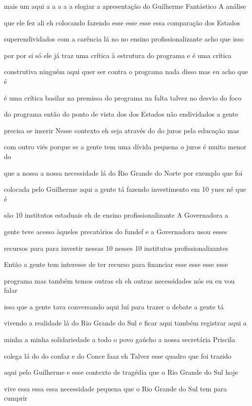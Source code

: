 \documentclass[a4paper,12pt]{article}
\begin{document}
mais um aqui a a a a a elogiar a apresentação do Guilherme Fantástico A análise

que ele fez ali eh colocando fazendo esse esse esse essa comparação dos Estados

superendividados com a carência lá no no ensino profissionalizante acho que isso

por por si só ele já traz uma crítica à estrutura do programa e é uma crítica

construtiva ninguém aqui quer ser contra o programa nada disso mas eu acho que é

é uma crítica basilar na premissa do programa na falta talvez no desvio do foco

do programa então do ponto de vista dos dos Estados não endividados a gente

precisa se inserir Nesse contexto eh seja através do do juros pela educação mas

com outro viés porque se a gente tem uma dívida pequena o juros é muito menor do

que a nossa a nossa necessidade lá do Rio Grande do Norte por exemplo que foi

colocada pelo Guilherme aqui a gente tá fazendo investimento em 10 ynes né que é

são 10 institutos estaduais eh de ensino profissionalizante A Governadora a

gente teve acesso àqueles precatórios do fundef e a Governadora usou esses

recursos para para investir nessas 10 nesses 10 institutos profissionalizantes

Então a gente tem interesse de ter recurso para financiar esse esse esse esse

programa mas também temos outras eh eh outras necessidades nós eu eu vou falar

isso que a gente tava conversando aqui luí para trazer o debate a gente tá

vivendo a realidade lá do Rio Grande do Sul e ficar aqui também registrar aqui a

minha a minha solidariedade a todo o povo gaúcho a nossa secretária Priscila

colega lá do do confaz e do Conce faaz eh Talvez esse quadro que foi trazido

aqui pelo Guilherme e esse contexto de tragédia que o Rio Grande do Sul hoje

vive essa essa essa necessidade pequena que o Rio Grande do Sul tem para cumprir
\end{document}
